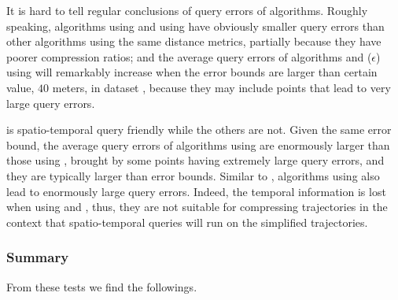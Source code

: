 {
It is hard to tell regular conclusions of query errors of \lsa algorithms. Roughly speaking, algorithms \intersec using \dad and \squishe using \sed have obviously smaller query errors than other algorithms using the same distance metrics, partially because they have poorer compression ratios; and the average query errors of algorithms \operb and \siped($\epsilon$) using \ped will remarkably increase when the error bounds are larger than certain value, \eg $40$ meters, in dataset \mopsi, because they may include points that lead to very large query errors.





\sed is spatio-temporal query friendly while the others are not.
Given the same error bound, the average query errors of algorithms using \ped are enormously larger than those using \sed, brought by some points having extremely large query errors, and they are typically larger than error bounds.
Similar to \ped, algorithms using \dad also lead to enormously large query errors.
Indeed, the temporal information is lost when using \ped and \dad, thus, they are not suitable for compressing trajectories in the context that spatio-temporal queries will run on the simplified trajectories.




\subsubsection{Summary}
From these tests we find the followings.

}

